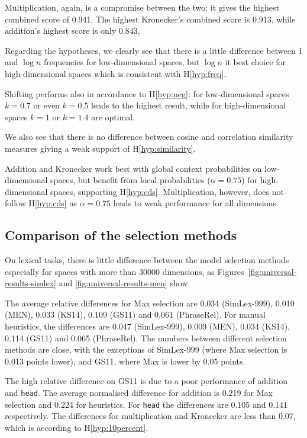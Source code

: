 Multiplication, again, is a compromise between the two: it gives the highest combined score of 0.941. The highest Kronecker's combined score is 0.913, while addition's highest score is only 0.843.

Regarding the hypotheses, we clearly see that there is a little difference between 1 and $\log n$ frequencies for low-dimensional spaces, but $\log n$ it best choice for high-dimensional spaces which is consistent with H\ref{hyp:freq}.

Shifting performs also in accordance to H\ref{hyp:neg}: for low-dimensional spaces $k=0.7$ or even $k=0.5$ leads to the highest result, while for high-dimensional spaces $k=1$ or $k=1.4$ are optimal.

We also see that there is no difference between cosine and correlation similarity measures giving a weak support of H\ref{hyp:similarity}.

Addition and Kronecker work best with global context probabilities on low-dimensional spaces, but benefit from local probabilities ($\alpha=0.75$) for high-dimensional spaces, supporting H\ref{hyp:cds}. Multiplication, however, does not follow H\ref{hyp:cds} as $\alpha=0.75$ leads to weak performance for all dimensions.

\subsection{Comparison of the selection methods}
\label{sec:comparison-universal}



On lexical tasks, there is little difference between the model selection methods especially for spaces with more than 30000 dimensions, as Figures~\ref{fig:universal-results-simlex} and \ref{fig:universal-results-men} show.

The average relative differences for Max selection are 0.034 (SimLex-999), 0.010 (MEN), 0.033 (KS14), 0.109 (GS11) and 0.061 (PhraseRel). For manual heuristics, the differences are 0.047 (SimLex-999), 0.009 (MEN), 0.034 (KS14), 0.114 (GS11) and 0.065 (PhraseRel). The numbers between different selection methods are close, with the exceptions of SimLex-999 (where Max selection is 0.013 points lower), and GS11, where Max is lower by 0.05 points.

The high relative difference on GS11 is due to a poor performance of addition and \texttt{head}. The average normalised difference for addition is 0.219 for Max selection and 0.224 for heuristics. For \texttt{head} the differences are 0.105 and 0.141 respectively. The differences for multiplication and Kronecker are less than 0.07, which is according to H\ref{hyp:10percent}.

